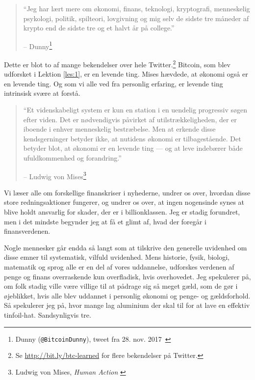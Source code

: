 \begin{quotation}\begin{samepage}
\enquote{Jeg har lært mere om økonomi, finans, teknologi, kryptografi, menneskelig psykologi, politik, spilteori, lovgivning og mig selv de sidste tre måneder af krypto end de sidste tre og et halvt år på college.}
\begin{flushright} -- Dunny\footnote{Dunny (\texttt{@BitcoinDunny}), tweet fra 28. nov. 2017~\cite{bitcoindunny-tweet}}
\end{flushright}\end{samepage}\end{quotation}

Dette er blot to af mange bekendelser over hele Twitter.\footnote{Se \url{http://bit.ly/btc-learned} for flere bekendelser på Twitter.} Bitcoin, som blev udforsket i Lektion \ref{les:1}, er en levende ting. Mises hævdede, at økonomi også er en levende ting. Og som vi alle ved fra personlig erfaring, er levende ting intrinsisk svære at forstå.

\begin{quotation}\begin{samepage}
\enquote{Et videnskabeligt system er kun en station i en uendelig progressiv
søgen efter viden. Det er nødvendigvis påvirket af utilstrækkeligheden,
der er iboende i enhver menneskelig bestræbelse. Men at erkende disse kendsgerninger
betyder ikke, at nutidens økonomi er tilbagestående. Det betyder blot, at
økonomi er en levende ting --- og at leve indebærer både ufuldkommenhed
og forandring.}
\begin{flushright} -- Ludwig von Mises\footnote{Ludwig von Mises, \textit{Human Action}
\cite{human-action}}
\end{flushright}\end{samepage}\end{quotation}

\newpage

Vi læser alle om forskellige finanskriser i nyhederne, undrer os over, hvordan disse store redningsaktioner fungerer, og undrer os over, at ingen nogensinde synes at blive holdt ansvarlig for skader, der er i billionklassen. Jeg er stadig forundret, men i det mindste begynder jeg at få et glimt af, hvad der foregår i finansverdenen.

Nogle mennesker går endda så langt som at tilskrive den generelle uvidenhed om disse emner til systematisk, vilfuld uvidenhed. Mens historie, fysik, biologi, matematik og sprog alle er en del af vores uddannelse, udforskes verdenen af penge og finans overraskende kun overfladisk, hvis overhovedet. Jeg spekulerer på, om folk stadig ville være villige til at pådrage sig så meget gæld, som de gør i øjeblikket, hvis alle blev uddannet i personlig økonomi og penge- og gældsforhold. Så spekulerer jeg på, hvor mange lag aluminium der skal til for at lave en effektiv tinfoil-hat. Sandsynligvis tre.

